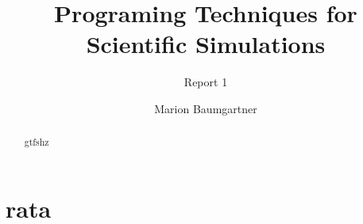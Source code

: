 \documentclass[a4paper,10pt]{article}
\title{Programing Techniques for Scientific Simulations}
\subtitle{Report 1}
\author{Marion Baumgartner}
\begin{document}
\maketitle

\begin{abstract}
gtfshz
\end{abstract}

\section{rata}
\end{document}
